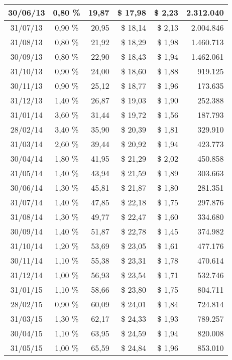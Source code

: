 \begin{center}
\begin{longtable}{|c|c|r|r|r|r|}
30/06/13 & 0,80 \% & 19,87 & \$ 17,98 & \$ 2,23 & 2.312.040 \\ \hline
31/07/13 & 0,90 \% & 20,95 & \$ 18,14 & \$ 2,13 & 2.004.846 \\ \hline
31/08/13 & 0,80 \% & 21,92 & \$ 18,29 & \$ 1,98 & 1.460.713 \\ \hline
30/09/13 & 0,80 \% & 22,90 & \$ 18,43 & \$ 1,94 & 1.462.061 \\ \hline
31/10/13 & 0,90 \% & 24,00 & \$ 18,60 & \$ 1,88 & 919.125 \\ \hline
30/11/13 & 0,90 \% & 25,12 & \$ 18,77 & \$ 1,96 & 173.635 \\ \hline
31/12/13 & 1,40 \% & 26,87 & \$ 19,03 & \$ 1,90 & 252.388 \\ \hline
31/01/14 & 3,60 \% & 31,44 & \$ 19,72 & \$ 1,56 & 187.793 \\ \hline
28/02/14 & 3,40 \% & 35,90 & \$ 20,39 & \$ 1,81 & 329.910 \\ \hline
31/03/14 & 2,60 \% & 39,44 & \$ 20,92 & \$ 1,94 & 423.773 \\ \hline
30/04/14 & 1,80 \% & 41,95 & \$ 21,29 & \$ 2,02 & 450.858 \\ \hline
31/05/14 & 1,40 \% & 43,94 & \$ 21,59 & \$ 1,89 & 303.663 \\ \hline
30/06/14 & 1,30 \% & 45,81 & \$ 21,87 & \$ 1,80 & 281.351 \\ \hline
31/07/14 & 1,40 \% & 47,85 & \$ 22,18 & \$ 1,75 & 297.876 \\ \hline
31/08/14 & 1,30 \% & 49,77 & \$ 22,47 & \$ 1,60 & 334.680 \\ \hline
30/09/14 & 1,40 \% & 51,87 & \$ 22,78 & \$ 1,45 & 374.982 \\ \hline
31/10/14 & 1,20 \% & 53,69 & \$ 23,05 & \$ 1,61 & 477.176 \\ \hline
30/11/14 & 1,10 \% & 55,38 & \$ 23,31 & \$ 1,78 & 470.614 \\ \hline
31/12/14 & 1,00 \% & 56,93 & \$ 23,54 & \$ 1,71 & 532.746 \\ \hline
31/01/15 & 1,10 \% & 58,66 & \$ 23,80 & \$ 1,75 & 804.711 \\ \hline
28/02/15 & 0,90 \% & 60,09 & \$ 24,01 & \$ 1,84 & 724.814 \\ \hline
31/03/15 & 1,30 \% & 62,17 & \$ 24,33 & \$ 1,93 & 789.257 \\ \hline
30/04/15 & 1,10 \% & 63,95 & \$ 24,59 & \$ 1,94 & 820.008 \\ \hline
31/05/15 & 1,00 \% & 65,59 & \$ 24,84 & \$ 1,96 & 853.010 \\ \hline

\end{longtable}
\end{center}
